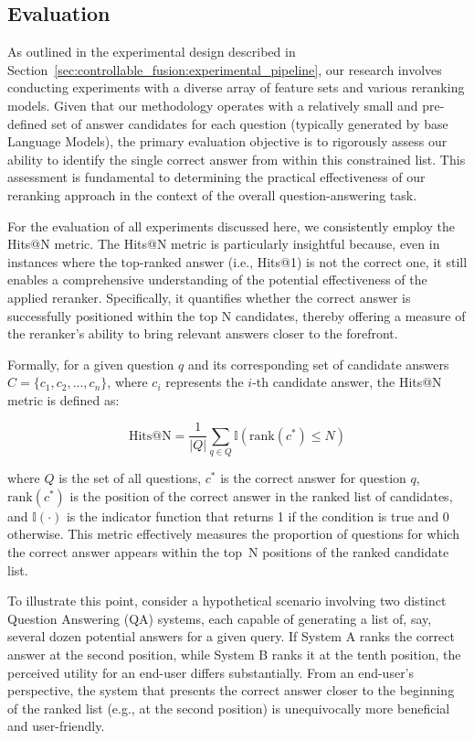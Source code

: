 \subsection{Evaluation} \label{sec:controllable_fusion:evaluation}

As outlined in the experimental design described in Section~\ref{sec:controllable_fusion:experimental_pipeline}, our research involves conducting experiments with a diverse array of feature sets and various reranking models. Given that our methodology operates with a relatively small and pre-defined set of answer candidates for each question (typically generated by base Language Models), the primary evaluation objective is to rigorously assess our ability to identify the single correct answer from within this constrained list. This assessment is fundamental to determining the practical effectiveness of our reranking approach in the context of the overall question-answering task.

For the evaluation of all experiments discussed here, we consistently employ the {Hits@N} metric. The {Hits@N} metric is particularly insightful because, even in instances where the top-ranked answer (i.e., Hits@1) is not the correct one, it still enables a comprehensive understanding of the potential effectiveness of the applied reranker. Specifically, it quantifies whether the correct answer is successfully positioned within the top N candidates, thereby offering a measure of the reranker's ability to bring relevant answers closer to the forefront.

Formally, for a given question $q$ and its corresponding set of candidate answers $C = \{c_1, c_2, ..., c_n\}$, where $c_i$ represents the $i$-th candidate answer, the Hits@N metric is defined as:

\begin{equation}
    \text{Hits@N} = \frac{1}{|Q|} \sum_{q \in Q} \mathbb{I}(\text{rank}(c^*) \leq N)
\end{equation}

where $Q$ is the set of all questions, $c^*$ is the correct answer for question $q$, $\text{rank}(c^*)$ is the position of the correct answer in the ranked list of candidates, and $\mathbb{I}(\cdot)$ is the indicator function that returns 1 if the condition is true and 0 otherwise. This metric effectively measures the proportion of questions for which the correct answer appears within the top~N positions of the ranked candidate list.

To illustrate this point, consider a hypothetical scenario involving two distinct Question Answering (QA) systems, each capable of generating a list of, say, several dozen potential answers for a given query. If System A ranks the correct answer at the second position, while System B ranks it at the tenth position, the perceived utility for an end-user differs substantially. From an end-user's perspective, the system that presents the correct answer closer to the beginning of the ranked list (e.g., at the second position) is unequivocally more beneficial and user-friendly.

